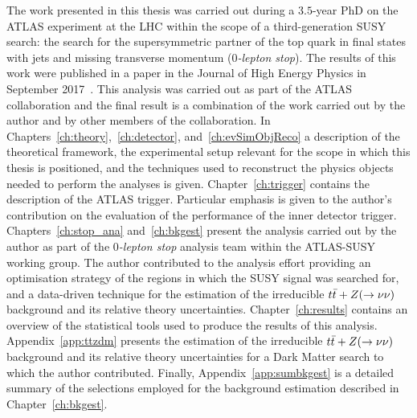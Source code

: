 The work presented in this thesis was carried out during a $3.5$-year PhD on the \acs{ATLAS} experiment at the \ac{LHC} within the scope of a third-generation \ac{SUSY} search: the search for the supersymmetric partner of the top quark in final states with jets and missing transverse momentum (\emph{$0$-lepton stop}). The results of this work were published in a paper in the Journal of High Energy Physics in September 2017~\cite{stop0L}. This analysis was carried out as part of the \acs{ATLAS} collaboration and the final result is a combination of the work carried out by the author and by other members of the collaboration. In Chapters~\ref{ch:theory},~\ref{ch:detector}, and~\ref{ch:evSimObjReco} a description of the theoretical framework, the experimental setup relevant for the scope in which this thesis is positioned, and the techniques used to reconstruct the physics objects needed to perform the analyses is given. Chapter~\ref{ch:trigger} contains the description of the \acs{ATLAS} trigger. Particular emphasis is given to the author’s contribution on the evaluation of the performance of the inner detector trigger. Chapters~\ref{ch:stop_ana} and~\ref{ch:bkgest} present the analysis carried out by the author as part of the \emph{$0$-lepton stop} analysis team within the \acs{ATLAS}-SUSY working group. The author contributed to the analysis effort providing an optimisation strategy of the regions in which the \ac{SUSY} signal was searched for, and a data-driven technique for the estimation of the irreducible $t\bar{t}+Z (\rightarrow \nu \nu)$ background and its relative theory uncertainties. Chapter~\ref{ch:results} contains an overview of the statistical tools used to produce the results of this analysis. Appendix~\ref{app:ttzdm} presents the estimation of the irreducible $t\bar{t}+Z (\rightarrow \nu \nu)$ background and its relative theory uncertainties for a Dark Matter search to which the author contributed. Finally, Appendix~\ref{app:sumbkgest} is a detailed summary of the selections employed for the background estimation described in Chapter~\ref{ch:bkgest}.